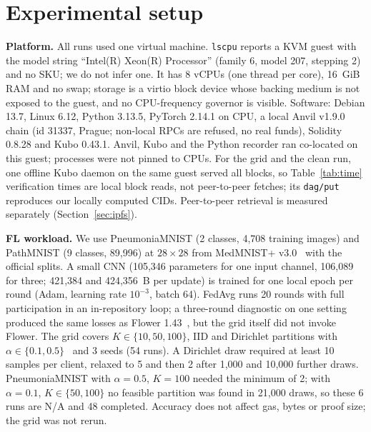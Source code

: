\documentclass[final,3p,times,twocolumn]{elsarticle}
\begin{document}
\section{Experimental setup}\label{sec:setup}
\textbf{Platform.} All runs used one virtual machine. \texttt{lscpu} reports a KVM guest with the model string ``Intel(R) Xeon(R) Processor'' (family 6, model 207, stepping 2) and no SKU; we do not infer one. It has 8 vCPUs (one thread per core), 16~GiB RAM and no swap; storage is a virtio block device whose backing medium is not exposed to the guest, and no CPU-frequency governor is visible. Software: Debian 13.7, Linux 6.12, Python 3.13.5, PyTorch 2.14.1 on CPU, a local Anvil v1.9.0 chain (id 31337, Prague; non-local RPCs are refused, no real funds), Solidity 0.8.28 and Kubo 0.43.1. Anvil, Kubo and the Python recorder ran co-located on this guest; processes were not pinned to CPUs. For the grid and the clean run, one offline Kubo daemon on the same guest served all blocks, so Table~\ref{tab:time} verification times are local block reads, not peer-to-peer fetches; its \texttt{dag/put} reproduces our locally computed CIDs. Peer-to-peer retrieval is measured separately (Section~\ref{sec:ipfs}).

\textbf{FL workload.} We use PneumoniaMNIST (2 classes, 4,708 training images) and PathMNIST (9 classes, 89,996) at $28\times28$ from MedMNIST+ v3.0~\cite{medmnist,medmnistplus} with the official splits. A small CNN (105,346 parameters for one input channel, 106,089 for three; 421,384 and 424,356~B per update) is trained for one local epoch per round (Adam, learning rate $10^{-3}$, batch 64). FedAvg runs 20 rounds with full participation in an in-repository loop; a three-round diagnostic on one setting produced the same losses as Flower 1.43~\cite{flower}, but the grid itself did not invoke Flower. The grid covers $K\in\{10,50,100\}$, IID and Dirichlet partitions with $\alpha\in\{0.1,0.5\}$~\cite{hsu} and 3 seeds (54 runs). A Dirichlet draw required at least 10 samples per client, relaxed to 5 and then 2 after 1,000 and 10,000 further draws. PneumoniaMNIST with $\alpha=0.5$, $K=100$ needed the minimum of 2; with $\alpha=0.1$, $K\in\{50,100\}$ no feasible partition was found in 21,000 draws, so these 6 runs are N/A and 48 completed. Accuracy does not affect gas, bytes or proof size; the grid was not rerun.
\end{document}
